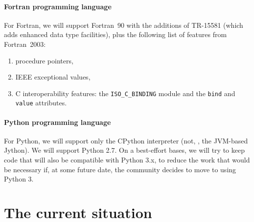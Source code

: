 \documentclass[draftmode,draftwater]{memarticle}
\begin{document}
\subsubsection{Fortran programming language}

For Fortran, we will support Fortran~90 with the additions of TR-15581
(which adds enhanced data type facilities), plus the following list of
features from Fortran~2003:
\begin{enumerate}
\item procedure pointers,
\item IEEE exceptional values,
\item C interoperability features: the \texttt{ISO\_C\_BINDING} module
  and the \texttt{bind} and \texttt{value} attributes.
\end{enumerate}

\subsubsection{Python programming language}

For Python, we will support only the CPython interpreter (not, \eg, the
JVM-based Jython). We will support Python 2.7. On a best-effort bases,
we will try to keep code that will also be compatible with Python 3.x,
to reduce the work that would be necessary if, at some future date, the
community decides to move to using Python 3.



\chapter{The current situation\label{ch:current_situation}}
\end{document}
